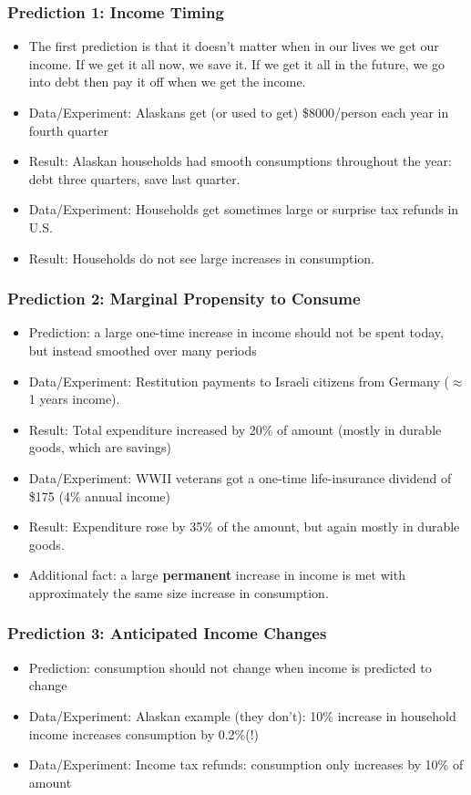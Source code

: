 \documentclass{beamer}
\begin{document}
\begin{frame}
\frametitle{Prediction 1: Income Timing}
\begin{itemize}
\item The first prediction is that it doesn't matter when in our lives we get our income.  If we get it all now, we save it.  If we get it all in the future, we go into debt then pay it off when we get the income.  
\bigskip
\item Data/Experiment:  Alaskans get (or used to get) \$8000/person each year in fourth quarter
\bigskip
\item Result:  Alaskan households had smooth consumptions throughout the year: debt three quarters, save last quarter.
\bigskip
\item Data/Experiment:  Households get sometimes large or surprise tax refunds in U.S.
\bigskip
\item Result:  Households do not see large increases in consumption.
\end{itemize}
\end{frame}


\begin{frame}
\frametitle{Prediction 2: Marginal Propensity to Consume}
\begin{itemize}
\item Prediction:  a large one-time increase in income should not be spent today, but instead smoothed over many periods  
\bigskip
\item Data/Experiment:  Restitution payments to Israeli citizens from Germany ($\approx$ 1 years income).
\bigskip
\item Result:  Total expenditure increased by 20\% of amount (mostly in durable goods, which are savings)
\bigskip
\item Data/Experiment:  WWII veterans got a one-time life-insurance dividend of \$175 (4\% annual income)
\bigskip
\item Result:  Expenditure rose by 35\% of the amount, but again mostly in durable goods.
\bigskip
\item Additional fact:  a large \textbf{permanent} increase in income is met with approximately the same size increase in consumption. 
\end{itemize}
\end{frame}

\begin{frame}
\frametitle{Prediction 3: Anticipated Income Changes}
\begin{itemize}
\item Prediction:  consumption should not change when income is predicted to change
\bigskip
\item Data/Experiment:  Alaskan example (they don't): 10\% increase in household income increases consumption by 0.2\%(!)
\bigskip
\item Data/Experiment: Income tax refunds:  consumption only increases by 10\% of amount
\end{itemize}
\end{frame}
\end{document}
